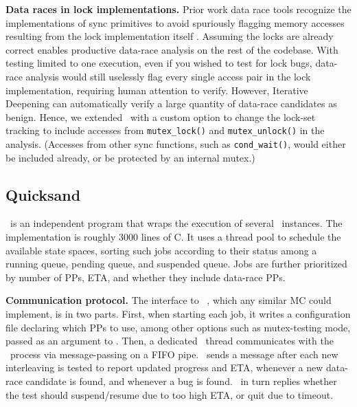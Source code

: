 {\bf Data races in lock implementations.}
Prior work data race tools recognize the implementations of sync primitives to avoid spuriously flagging memory accesses resulting from the lock implementation itself \cite{tsan}.
Assuming the locks are already correct enables productive data-race analysis on the rest of the codebase.
With testing limited to one execution, even if you wished to test for lock bugs, data-race analysis would still uselessly flag every single access pair in the lock implementation, requiring human attention to verify.
However, Iterative Deepening can automatically verify a large quantity of data-race candidates as benign.
Hence, we extended \landslide~with a custom option to change the lock-set tracking to include accesses from {\tt mutex\_lock()} and {\tt mutex\_unlock()} in the analysis. (Accesses from other sync functions, such as {\tt cond\_wait()}, would either be included already, or be protected by an internal mutex.)

\subsection{Quicksand} %

\quicksand~is an independent program that wraps the execution of several \landslide~instances.
The implementation is roughly 3000 lines of C.
It uses a thread pool to schedule the available state spaces,
sorting such jobs according to their status among a running queue, pending queue, and suspended queue.
Jobs are further prioritized by number of PPs, ETA, and whether they include data-race PPs.

{\bf Communication protocol.}
The interface to \landslide~, which any similar MC could implement, is in two parts.
First, when starting each job, it writes a configuration file declaring which PPs to use,
among other options such as mutex-testing mode,
passed as an argument to \landslide.
Then, a dedicated \quicksand~thread communicates with the \landslide~process via message-passing on a FIFO pipe.
\landslide~sends a message after each new interleaving is tested to report updated progress and ETA,
whenever a new data-race candidate is found, and whenever a bug is found.
\quicksand~in turn replies whether the test should suspend/resume due to too high ETA, or quit due to timeout.

